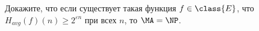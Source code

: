 Докажите, что если существует такая функция $f \in \class{E}$, что $H_{avg}(f)(n) \ge 2^{\varepsilon n}$
при всех $n$, то $\MA = \NP$.
